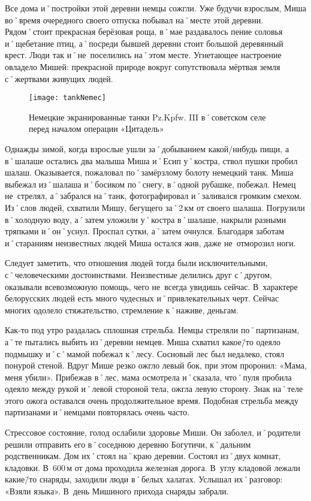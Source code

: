 Все дома и˚постройки этой деревни немцы сожгли. Уже будучи взрослым, Миша во˚время очередного своего отпуска побывал на˚месте этой деревни. Рядом˚стоит прекрасная берёзовая роща, в˚мае раздавалось пение соловья и˚щебетание птиц, а˚посреди бывшей деревни стоит большой деревянный крест. Люди так и˚не~поселились на˚этом месте. Угнетающее настроение овладело Мишей: прекрасной природе вокруг сопутствовала мёртвая земля с˚жертвами живущих людей. 

\begin{wrapfigure}{O}{.4\textwidth}
\centering
\texttt{[image: tankNemec]}
\caption{Немецкие экранированные танки Pz.Kpfw. III в˚советском селе перед началом операции «Цитадель»}
\label{fig:tankNemec}
\end{wrapfigure}

Однажды зимой, когда взрослые ушли за˚добыванием какой\-/нибудь пищи, а в˚шалаше остались два малыша Миша и˚Есип у˚костра, ствол пушки пробил шалаш. Оказывается, пожаловал по˚замёрзлому болоту немецкий танк. Миша выбежал из˚шалаша и˚босиком по˚снегу, в˚одной рубашке, побежал. Немец не~стрелял, а˚забрался на˚танк, фотографировал и˚заливался громким смехом. Из˚слов людей, схватили Мишу, бегущего за˚2\,км от своего шалаша. Погрузили в˚холодную воду, а˚затем уложили у˚костра в˚шалаше, накрыли разными тряпками и˚он˚уснул. Проспал сутки, а˚затем очнулся. Благодаря заботам и˚стараниям неизвестных людей Миша остался жив, даже не~отморозил ноги.

Следует заметить, что отношения людей тогда были исключительными, с˚человеческими достоинствами. Неизвестные делились друг с˚другом, оказывали всевозможную помощь, чего не~всегда увидишь сейчас. В~характере белорусских людей есть много чудесных и˚привлекательных черт. Сейчас многих одолело стяжательство, стремление к˚наживе, деньгам.

Как-то под утро раздалась сплошная стрельба. Немцы стреляли по˚партизанам, а˚те пытались выбить из˚деревни немцев. Миша схватил какое\=/то одеяло подмышку и˚с˚мамой побежал к˚лесу. Сосновый лес был недалеко, стоял понурой стеной. Вдруг Мише резко ожгло левый бок, при этом проронил: «Мама, меня убили». Прибежав в˚лес, мама осмотрела и˚сказала, что˚пуля пробила одеяло между рукой и˚левой стороной тела, ожгла левую сторону. Знак на˚теле этого ожога оставался очень продолжительное время. Подобная стрельба между партизанами и˚немцами повторялась очень часто.

Стрессовое состояние, голод ослабили здоровье Миши. Он заболел, и˚родители решили отправить его в˚соседнюю деревню Богутичи, к˚дальним родственникам. Дом их˚стоял на˚краю деревни. Состоял из˚двух комнат, кладовки. В~600\,м от дома проходила железная дорога. В~углу кладовой лежали какие\=/то снаряды, заходили люди в˚белых халатах. Услышал их˚разговор: «Взяли языка». В~день Мишиного прихода снаряды забрали. 


